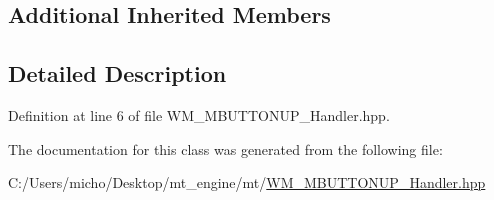 \subsection*{Additional Inherited Members}


\subsection{Detailed Description}


Definition at line 6 of file W\+M\+\_\+\+M\+B\+U\+T\+T\+O\+N\+U\+P\+\_\+\+Handler.\+hpp.



The documentation for this class was generated from the following file\+:\begin{DoxyCompactItemize}
\item 
C\+:/\+Users/micho/\+Desktop/mt\+\_\+engine/mt/\hyperlink{_w_m___m_b_u_t_t_o_n_u_p___handler_8hpp}{W\+M\+\_\+\+M\+B\+U\+T\+T\+O\+N\+U\+P\+\_\+\+Handler.\+hpp}\end{DoxyCompactItemize}

